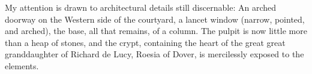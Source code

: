 My attention is drawn to architectural details still discernable: An arched doorway on the Western side of the courtyard, a lancet window (narrow, pointed, and arched), the base, all that remains, of a column. The pulpit is now little more than a heap of stones, and the crypt, containing the heart of the great great granddaughter of Richard de Lucy, Roesia of Dover, is mercilessly exposed to the elements.


